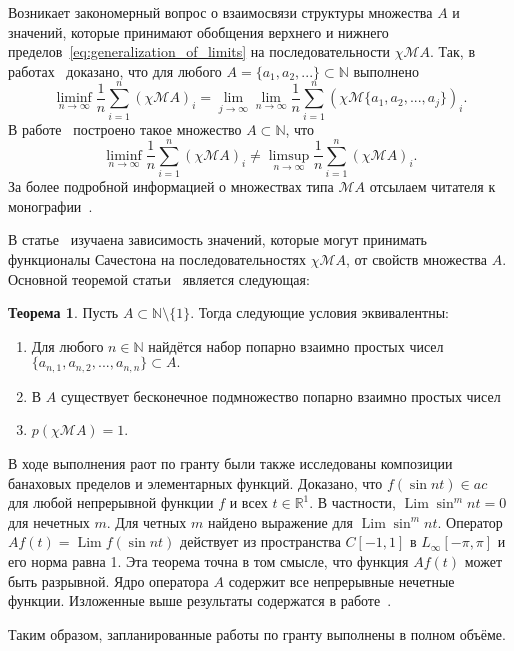 \documentclass[a4paper,openbib]{report}
\theoremstyle{definition}
\newtheorem{theorem}[lemma]{Теорема}
\begin{document}
Возникает закономерный вопрос о взаимосвязи структуры множества $A$
и значений, которые принимают обобщения верхнего и нижнего пределов~\eqref{eq:generalization_of_limits}
на последовательности $\chi \mathscr{M}\!A$.
Так, в работах~\cite{davenport1936sequences,davenport1951sequences} доказано, что для любого
$A=\{a_1,a_2,...\}\subset\mathbb{N}$
выполнено
\begin{equation}
	\liminf_{n\to\infty}\frac1{n}\sum_{i=1}^n (\chi\mathscr{M}A)_i =
	\lim_{j\to\infty}\lim_{n\to\infty}\frac1{n}\sum_{i=1}^n (\chi\mathscr{M}\{a_1,a_2,...,a_j\})_i
	.
\end{equation}
В работе~\cite[\S 7]{besicovitch1935density} построено такое множество $A\subset\mathbb{N}$, что
\begin{equation}
	\liminf_{n\to\infty}\frac1{n}\sum_{i=1}^n (\chi\mathscr{M}A)_i \neq
	\limsup_{n\to\infty}\frac1{n}\sum_{i=1}^n (\chi\mathscr{M}A)_i
	.
\end{equation}
За более подробной информацией о множествах типа $\mathscr{M}A$ отсылаем читателя к монографии~\cite{hall1996multiples}.

В статье~\cite{avdeev2021vmzprimes} изучаена зависимость значений, которые могут принимать функционалы Сачестона
на последовательностях $\chi\mathscr{M}A$, от свойств множества $A$.
Основной теоремой статьи~\cite{avdeev2021vmzprimes} является следующая:

\begin{theorem}
	Пусть $A\subset \mathbb{N}\setminus\{1\}$.
	Тогда следующие условия эквивалентны:
	\begin{enumerate}%
		\item
			Для любого $n\in\mathbb{N}$ найдётся набор попарно взаимно простых чисел
			$
				\{a_{n,1}, a_{n,2}, ..., a_{n,n}  \} \subset A
				.
			$
		\item
			В $A$ существует бесконечное подмножество попарно взаимно простых чисел
		\item
			$p(\chi\mathscr{M}A)=1$.
	\end{enumerate}
\end{theorem}



В ходе выполнения раот по гранту были также исследованы композиции банаховых пределов и элементарных функций.
Доказано, что $f(\sin nt) \in ac$ для любой непрерывной функции $f$ и всех
    $t \in \mathbb R^1$. В частности, $\operatorname{Lim} \sin^m nt = 0$ для
    нечетных $m$. Для четных $m$ найдено выражение для $\operatorname{Lim} \sin^m nt$. Оператор
    $Af(t) = \operatorname{Lim} f(\sin nt)$ действует из пространства $C[-1, 1]$
    в $L_\infty[-\pi, \pi]$ и его норма равна 1. Эта теорема точна в том смысле,
    что функция $Af(t)$ может быть разрывной. Ядро оператора $A$ содержит все непрерывные
    нечетные функции. Изложенные выше результаты содержатся в работе~\cite{zvolinsky2021subspace}.



Таким образом, запланированные работы по гранту выполнены в полном объёме.




\small
\printbibliography{}
\end{document}
